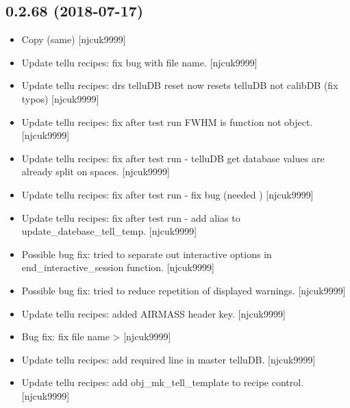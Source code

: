 \documentclass[a4paper,10pt,english]{report}
\begin{document}
\subsection{0.2.68 (2018-07-17)}
\label{\detokenize{misc/changelog:id389}}\begin{itemize}
\item {} 
Copy (same) {[}njcuk9999{]}

\item {} 
Update tellu recipes: fix bug with file name. {[}njcuk9999{]}

\item {} 
Update tellu recipes: drs telluDB reset now resets telluDB not calibDB
(fix typos) {[}njcuk9999{]}

\item {} 
Update tellu recipes: fix after test run FWHM is function not object.
{[}njcuk9999{]}

\item {} 
Update tellu recipes: fix after test run - telluDB get database values
are already split on spaces. {[}njcuk9999{]}

\item {} 
Update tellu recipes: fix after test run - fix bug (needed
) {[}njcuk9999{]}

\item {} 
Update tellu recipes: fix after test run - add alias to
update\_datebase\_tell\_temp. {[}njcuk9999{]}

\item {} 
Possible bug fix: tried to separate out interactive options in
end\_interactive\_session function. {[}njcuk9999{]}

\item {} 
Possible bug fix: tried to reduce repetition of displayed warnings.
{[}njcuk9999{]}

\item {} 
Update tellu recipes: added AIRMASS header key. {[}njcuk9999{]}

\item {} 
Bug fix: fix file name  \textendash{}\textgreater{}
 {[}njcuk9999{]}

\item {} 
Update tellu recipes: add required line in master telluDB. {[}njcuk9999{]}

\item {} 
Update tellu recipes: add obj\_mk\_tell\_template to recipe control.
{[}njcuk9999{]}


\end{itemize}
\end{document}
